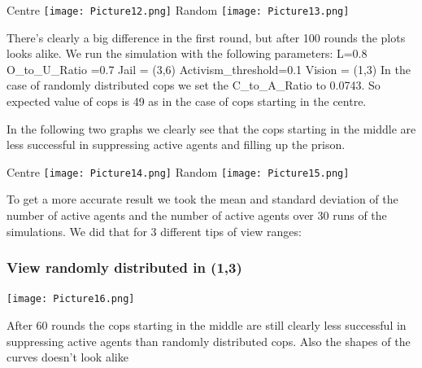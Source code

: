 \documentclass[11pt]{article}
\begin{document}
Centre\newline
\texttt{[image: Picture12.png]}\newline
Random\newline
\texttt{[image: Picture13.png]}\newline


There's clearly a big difference in the first round, but after 100 rounds the plots looks alike. \newline
We run the simulation with the following parameters: \newline
L=0.8\newline
O\_to\_U\_Ratio =0.7\newline
Jail = (3,6)\newline
Activism\_threshold=0.1\newline
Vision = (1,3)\newline
In the case of randomly distributed cops we set the C\_to\_A\_Ratio to 0.0743. So expected value of cops is 49 as in the case of cops starting in the centre.\newline\newline

In the following two graphs we clearly see that the cops starting in the middle are less successful in suppressing active agents and filling up the prison.\newline\newline

Centre\newline
\texttt{[image: Picture14.png]}\newline
Random\newline
\texttt{[image: Picture15.png]}\newline

To get a more accurate result we took the mean and standard deviation of the number of active agents and the number of active agents over 30 runs of the simulations. We did that for 3 different tips of view ranges:\newline\newline

\subsubsection{View randomly distributed in (1,3)}

\texttt{[image: Picture16.png]}

After 60 rounds the cops starting in the middle are still clearly less successful in suppressing active agents than randomly distributed cops. Also the shapes of the curves doesn’t look alike\newline\newline
\end{document}
